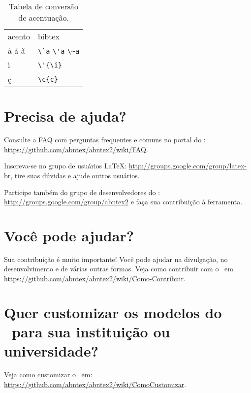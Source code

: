\begin{table}[htbp]
\caption{Tabela de convers\~{a}o de acentua\c{c}\~{a}o.}
\label{tabela-acentos}

\begin{center}
\begin{tabular}{ll}\hline\hline
acento & \textsf{bibtex}\\
\`{a} \'{a} \~{a} & \verb+\`a+ \verb+\'a+ \verb+\~a+\\
\'{\i} & \verb+\'{\i}+\\
\c{c} & \verb+\c{c}+\\
\hline\hline
\end{tabular}
\end{center}
\end{table}


\section{Precisa de ajuda?}

Consulte a FAQ com perguntas frequentes e comuns no portal do \abnTeX:
\url{https://github.com/abntex/abntex2/wiki/FAQ}.

Inscreva-se no grupo de usu\'{a}rios \LaTeX:
\url{http://groups.google.com/group/latex-br}, tire suas d\'{u}vidas e ajude
outros usu\'{a}rios.

Participe tamb\'{e}m do grupo de desenvolvedores do \abnTeX:
\url{http://groups.google.com/group/abntex2} e fa\c{c}a sua contribui\c{c}\~{a}o \`{a}
ferramenta.

\section{Voc\^{e} pode ajudar?}

Sua contribui\c{c}\~{a}o \'{e} muito importante! Voc\^{e} pode ajudar na divulga\c{c}\~{a}o, no
desenvolvimento e de v\'{a}rias outras formas. Veja como contribuir com o \abnTeX\
em \url{https://github.com/abntex/abntex2/wiki/Como-Contribuir}.

\section{Quer customizar os modelos do \abnTeX\ para sua institui\c{c}\~{a}o ou
universidade?}

Veja como customizar o \abnTeX\ em:
\url{https://github.com/abntex/abntex2/wiki/ComoCustomizar}.

